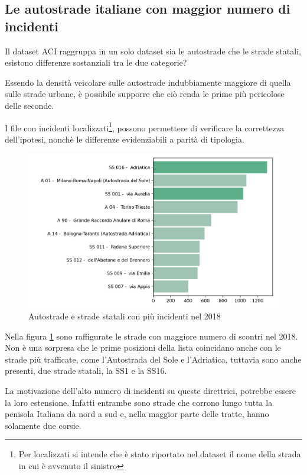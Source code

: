 \documentclass[a4paper,12pt]{report}
\begin{document}
\subsection{Le autostrade italiane con maggior numero di incidenti}

Il dataset ACI raggruppa in un solo dataset sia le autostrade che le strade statali, 
esistono differenze sostanziali tra le due categorie? 

Essendo la densità veicolare sulle autostrade indubbiamente 
maggiore di quella sulle strade urbane, è possibile supporre che 
ciò renda le prime più pericolose delle seconde.

I file con incidenti 
localizzati\footnote{Per localizzati si intende che è stato riportato nel dataset 
il nome della strada in cui è avvenuto il sinistro}, 
possono permettere di verificare la correttezza dell'ipotesi, 
nonchè le differenze evidenziabili a parità di tipologia. 

\begin{figure}
    \includegraphics[width=\linewidth]{../src/incidenti/incidenti_aci/autostrade/autostrade.png}
    \caption{Autostrade e strade statali con più incidenti nel 2018}
    \label{fig:incidenti-autostrade}
\end{figure}

Nella figura \ref{fig:incidenti-autostrade} sono  raffigurate le strade con 
maggiore numero di scontri nel 2018. 
Non è una sorpresa che le prime posizioni della lista coincidano 
anche con le strade più trafficate, come l'Autostrada del Sole e l'Adriatica, 
tuttavia sono anche presenti, due strade statali, la SS1 e la SS16. 

La motivazione dell'alto numero di incidenti su queste direttrici, potrebbe essere 
la loro estensione. Infatti entrambe sono strade che corrono lungo tutta la 
penisola Italiana da nord a sud e, nella maggior parte delle tratte, 
hanno solamente due corsie. 
\end{document}

